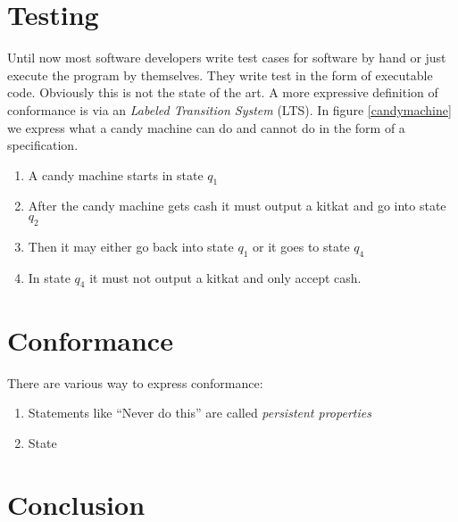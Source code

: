 \documentclass{article}
\begin{document}
\section*{Testing}
Until now most software developers write test cases for software by hand or just
execute the program by themselves. They write test in the form of executable
code. Obviously this is not the state of the art. A more expressive definition
of conformance is via an \textit{Labeled Transition System} (LTS).
In figure \ref{candymachine} we express what a candy machine can do and cannot
do in the form of a specification.
\begin{enumerate}
  \item A candy machine starts in state $q_1$
  \item After the candy machine gets cash it must output a
  kitkat and go into state $q_2$
  \item Then it may either go back into state $q_1$ or it goes to state $q_4$
  \item In state $q_4$ it must not output a kitkat and only accept cash.
\end{enumerate}

\section*{Conformance}
There are various way to express conformance: 
\begin{enumerate}
  \item Statements like ``Never do {\color{red}this}'' are called
  \textit{persistent properties}
  \item State
\end{enumerate}



\section*{Conclusion}





\end{document}
